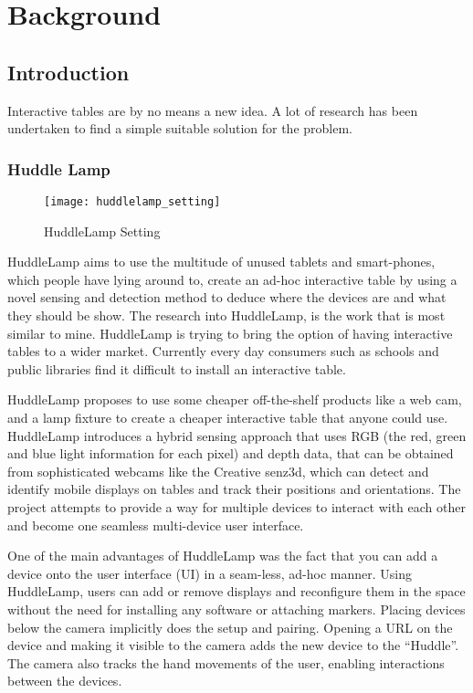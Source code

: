 
\chapter{Background}

\label{ch:background}

\section{Introduction}

Interactive tables are by no means a new idea. A lot of research has
been undertaken to find a simple suitable solution for the problem.

\subsection{Huddle Lamp}
\begin{figure}[H]
\centering
\texttt{[image: huddlelamp\_setting]}
\protect\caption{HuddleLamp Setting}
\end{figure}
HuddleLamp aims to use the multitude of unused tablets and smart-phones,
which people have lying around to, create an ad-hoc interactive table
by using a novel sensing and detection method to deduce where the
devices are and what they should be show. The research into HuddleLamp\cite{huddle-link}, is the work that
is most similar to mine. HuddleLamp is trying to bring the option of having interactive tables to a wider market. Currently every day consumers such as schools and public libraries find it difficult to install an interactive table.


HuddleLamp\cite{huddelamp-paper} proposes to use some cheaper
off-the-shelf products like a web cam, and a lamp fixture to create a cheaper
interactive table that anyone could use. HuddleLamp\cite{huddelamp-paper} introduces a hybrid sensing approach that uses RGB (the red, green and blue light information for each pixel) and depth data, that can be obtained from sophisticated webcams like the Creative senz3d\cite{creative-senz3d}, which can detect and identify mobile displays on tables and track their positions and orientations. The project attempts to provide a way for multiple devices to interact with each other and become one seamless multi-device user interface.

One of the main advantages of HuddleLamp was the fact that you can add a device onto the user interface (UI) in a seam-less, ad-hoc manner. Using HuddleLamp,
users can add or remove displays and reconfigure them in the space without
the need for installing any software or attaching markers. Placing
devices below the camera implicitly does the setup and pairing.
Opening a URL on the device and making it visible to the camera adds
the new device to the \textquotedblleft Huddle\textquotedblright .
The camera also tracks the hand movements of the user, enabling interactions
between the devices.

